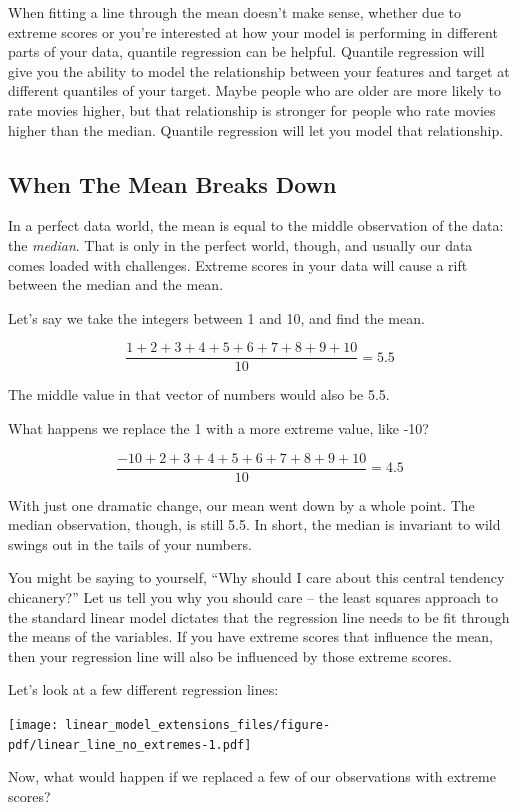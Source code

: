 \documentclass[
  letterpaper,
]{krantz}
\begin{document}
When fitting a line through the mean doesn't make sense, whether due to
extreme scores or you're interested at how your model is performing in
different parts of your data, quantile regression can be helpful.
Quantile regression will give you the ability to model the relationship
between your features and target at different quantiles of your target.
Maybe people who are older are more likely to rate movies higher, but
that relationship is stronger for people who rate movies higher than the
median. Quantile regression will let you model that relationship.

\subsection{When The Mean Breaks Down}\label{when-the-mean-breaks-down}

In a perfect data world, the mean is equal to the middle observation of
the data: the \emph{median}. That is only in the perfect world, though,
and usually our data comes loaded with challenges. Extreme scores in
your data will cause a rift between the median and the mean.

Let's say we take the integers between 1 and 10, and find the mean.

\[\frac{1+2+3+4+5+6+7+8+9+10}{10} =  5.5\]

The middle value in that vector of numbers would also be 5.5.

What happens we replace the 1 with a more extreme value, like -10?

\[\frac{-10+2+3+4+5+6+7+8+9+10}{10} =  4.5\]

With just one dramatic change, our mean went down by a whole point. The
median observation, though, is still 5.5. In short, the median is
invariant to wild swings out in the tails of your numbers.

You might be saying to yourself, ``Why should I care about this central
tendency chicanery?'' Let us tell you why you should care -- the least
squares approach to the standard linear model dictates that the
regression line needs to be fit through the means of the variables. If
you have extreme scores that influence the mean, then your regression
line will also be influenced by those extreme scores.

Let's look at a few different regression lines:

\texttt{[image: linear\_model\_extensions\_files/figure-pdf/linear\_line\_no\_extremes-1.pdf]}

Now, what would happen if we replaced a few of our observations with
extreme scores?
\end{document}
